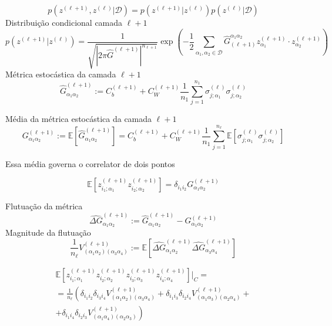 \documentclass{beamer}
\newcommand{\EE}{\mathbb{E}}
\newcommand{\Dcal}{\mathcal{D}}
\def\mi#1{{\alpha_{#1}}}
\def\eell{{(\ell)}}
\def\eellum{{(\ell+1)}}
\def\Gchapp#1{\widehat{G}^{(#1)}}
\newcommand{\Gchapeu}[3]{{\Gchapp{#1}_{\mi{#2}\mi{#3}}}}
\newcommand{\Gchapeuinv}[3]{\widehat{G}_{(#1)}^{\mi{#2}\mi{#3}}}
\newcommand{\Gnormal}[3]{{G^{(#1)}_{\mi{#2}\mi{#3}}}}
\newcommand{\Gflutu}[3]{{\widehat{\Delta G}^{(#1)}_{\mi{#2}\mi{#3}}}}
\newcommand{\Vertice}[5]{V^{(#1)}_{(\mi#2\mi#3)(\mi#4\mi#5)}}
\newcommand{\zia}[2]{z_{i_{#1};\mi{#2}}}
\begin{document}
\begin{frame}
	\begin{equation*}\tag{4.67}
		p\left(z^\eellum,z^\eell\Big|\Dcal\right) = p\left(z^\eellum\Big| z^\eell\right)p\left(z^\eell\Big| \Dcal\right)
	\end{equation*}
	Distribuição condicional camada $\ell+1$
{\footnotesize
	\begin{equation*}\tag{4.69}
			p\left(z^\eellum\Big| z^\eell\right) = \frac{1}{\sqrt{\left|2\pi \hat{G}^\eellum\right|^{n_{\ell+1}}}}
			\exp\left(-\frac{1}{2} \sum_{\mi1,\mi2\in\Dcal} \Gchapeuinv{\ell+1}12 z^\eellum_{\mi1}\cdot z^\eellum_{\mi2} \right)
		\end{equation*}
}
Métrica estocástica da camada $\ell+1$
	\begin{equation*}\tag{4.70}
		\Gchapeu{\ell+1}12 := C_b^\eellum + C_W^\eellum\frac{1}{n_1}\sum_{j=1}^{n_1} \sigma_{j;\mi1}^\eell\sigma_{j;\mi2}^\eell
	\end{equation*}
\end{frame}

\begin{frame}
	Média da métrica estocástica da camada $\ell+1$
	\begin{equation*}\tag{4.72}
		\Gnormal{\ell+1}12 := \EE\left[\Gchapeu{\ell+1}12 \right] =  C_b^\eellum + C_W^\eellum\frac{1}{n_1}\sum_{j=1}^{n_\ell} \EE\left[\sigma_{j;\mi1}^\eell\sigma_{j;\mi2}^\eell\right]
	\end{equation*}

	Essa média governa o correlator de dois pontos

	\begin{equation*}\tag{4.73}
		\EE\left[\zia11^\eellum \zia22^\eellum\right] = \delta_{i_1i_2}\Gnormal{\ell+1}12 
	\end{equation*}
\end{frame}

\begin{frame}
	
	Flutuação da métrica 
	\begin{equation*}\tag{4.74}
		\Gflutu{\ell+1}12 := \Gchapeu{\ell+1}12 - \Gnormal{\ell+1}12
	\end{equation*}
	Magnitude da flutuação
	\begin{equation*}\tag{4.76}
		\frac{1}{n_\ell}\Vertice{\ell+1}1234 := \EE\left[\Gflutu{\ell+1}12 \Gflutu{\ell+1}34 \right]
	\end{equation*}
\end{frame}

\begin{frame}
	\begin{multline*}
		\EE\left[\zia11^\eellum \zia22^\eellum \zia33^\eellum \zia44^\eellum\right]\Big|_{C} =\\= \frac{1}{n_\ell}\left( 
			\delta_{i_1i_2}\delta_{i_3i_4} \Vertice{\ell+1}1234 +
			\delta_{i_1i_3}\delta_{i_2i_4} \Vertice{\ell+1}1324 +\right.\\+\left.
			\delta_{i_1i_4}\delta_{i_2i_3} \Vertice{\ell+1}1423 
		\right)\tag{4.77}
	\end{multline*}
\end{frame}
\end{document}
